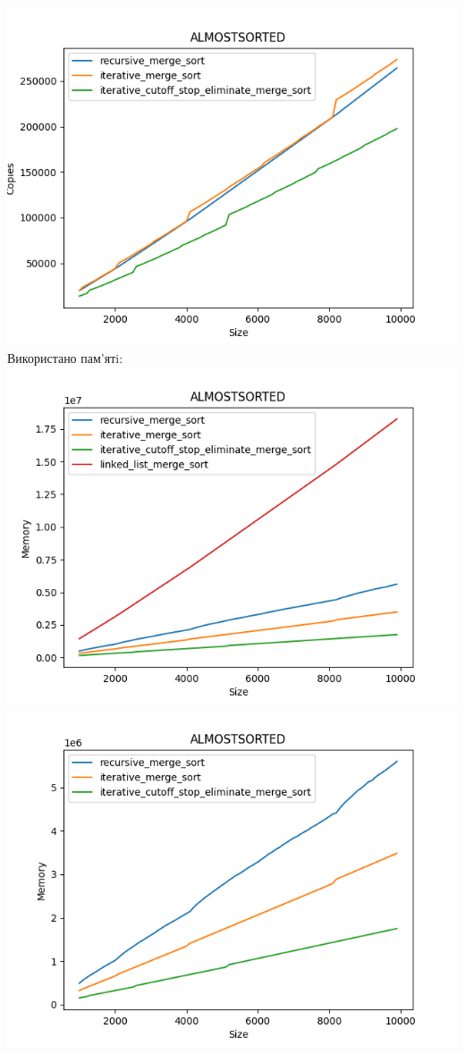 \documentclass{article}
\begin{document}
            \includegraphics[scale=0.5]{almostsorted_Copies_3_sorts_90_numbers_50.png}
        \newline
        Використано пам’ятi:
        \newline
            \includegraphics[scale=0.5]{almostsorted_Memory_4_sorts_90_numbers_50.png}
            \includegraphics[scale=0.5]{almostsorted_Memory_3_sorts_90_numbers_50.png}
\end{document}
